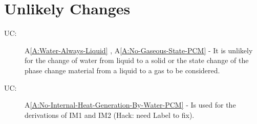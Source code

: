 \documentclass[12pt]{article}
\newcounter{ucnum}
\newcommand{\uctheucnum}{UC\theucnum}
\begin{document}
\section{Unlikely Changes}
\label{Sec:UCs}
\begin{description}
\item[\uctheucnum\label{UC:Water-PCM-Fixed-States}:]A\ref{A:Water-Always-Liquid} ,  A\ref{A:No-Gaseous-State-PCM} - It is unlikely for the change of water from liquid to a solid or the state change of the phase change material from a liquid to a gas to be considered.
\end{description}
\begin{description}
\item[\uctheucnum\label{UC:No-Internal-Heat-Generation}:]A\ref{A:No-Internal-Heat-Generation-By-Water-PCM} - Is used for the derivations of IM1 and IM2 (Hack: need Label to fix).
\end{description}
\end{document}
